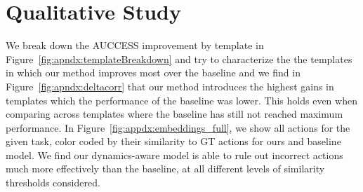 \documentclass{article}
\begin{document}
\begin{table}[t]
    \centering

\end{table}


\section{Qualitative Study}
We break down the AUCCESS improvement by template in Figure~\ref{fig:apndx:templateBreakdown} and try to characterize the the templates in which our method improves most over the baseline and we find in Figure~\ref{fig:apndx:deltacorr} that our method introduces the highest gains in templates which the performance of the baseline was lower. This holds even when comparing across templates where the baseline has still not reached maximum performance.
In Figure~\ref{fig:appdx:embeddings_full}, we show all actions for the given task, color coded by their similarity to GT actions for ours and baseline model. We find our dynamics-aware model is able to rule out incorrect actions much more effectively than the baseline, at all different levels of similarity thresholds considered.

















 
\end{document}
